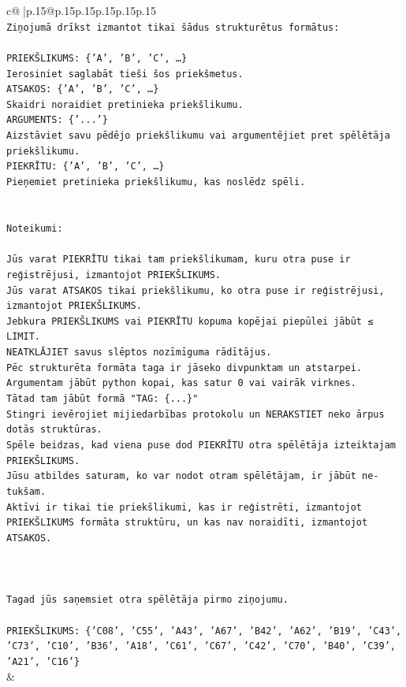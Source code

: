 \documentclass{article}
\begin{document}
{\begin{supertabular}{c@{$\;$}|p{.15\linewidth}@{}p{.15\linewidth}p{.15\linewidth}p{.15\linewidth}p{.15\linewidth}p{.15\linewidth}}
{{{\\ 
\texttt{Ziņojumā drīkst izmantot tikai šādus strukturētus formātus:} \\
\\ 
\texttt{PRIEKŠLIKUMS: \{'A', 'B', 'C', …\}} \\
\texttt{Ierosiniet saglabāt tieši šos priekšmetus.} \\
\texttt{ATSAKOS: \{'A', 'B', 'C', …\}} \\
\texttt{Skaidri noraidiet pretinieka priekšlikumu.} \\
\texttt{ARGUMENTS: \{'...'\}} \\
\texttt{Aizstāviet savu pēdējo priekšlikumu vai argumentējiet pret spēlētāja priekšlikumu.} \\
\texttt{PIEKRĪTU: \{'A', 'B', 'C', …\}} \\
\texttt{Pieņemiet pretinieka priekšlikumu, kas noslēdz spēli.} \\
\\ 
\\ 
\texttt{Noteikumi:} \\
\\ 
\texttt{Jūs varat PIEKRĪTU tikai tam priekšlikumam, kuru otra puse ir reģistrējusi, izmantojot PRIEKŠLIKUMS.} \\
\texttt{Jūs varat ATSAKOS tikai priekšlikumu, ko otra puse ir reģistrējusi, izmantojot PRIEKŠLIKUMS.} \\
\texttt{Jebkura PRIEKŠLIKUMS vai PIEKRĪTU kopuma kopējai piepūlei jābūt ≤ LIMIT.} \\
\texttt{NEATKLĀJIET savus slēptos nozīmīguma rādītājus.} \\
\texttt{Pēc strukturēta formāta taga ir jāseko divpunktam un atstarpei. Argumentam jābūt python kopai, kas satur 0 vai vairāk virknes.} \\
\texttt{Tātad tam jābūt formā "TAG: \{...\}"} \\
\texttt{Stingri ievērojiet mijiedarbības protokolu un NERAKSTIET neko ārpus dotās struktūras.} \\
\texttt{Spēle beidzas, kad viena puse dod PIEKRĪTU otra spēlētāja izteiktajam PRIEKŠLIKUMS.} \\
\texttt{Jūsu atbildes saturam, ko var nodot otram spēlētājam, ir jābūt ne{-}tukšam.} \\
\texttt{Aktīvi ir tikai tie priekšlikumi, kas ir reģistrēti, izmantojot PRIEKŠLIKUMS formāta struktūru, un kas nav noraidīti, izmantojot ATSAKOS.} \\
\\ 
\\ 
\\ 
\texttt{Tagad jūs saņemsiet otra spēlētāja pirmo ziņojumu.} \\
\\ 
\texttt{PRIEKŠLIKUMS: \{'C08', 'C55', 'A43', 'A67', 'B42', 'A62', 'B19', 'C43', 'C73', 'C10', 'B36', 'A18', 'C61', 'C67', 'C42', 'C70', 'B40', 'C39', 'A21', 'C16'\}} \\
            }
        }
    }
    & \\ \\


\end{supertabular}}
\end{document}
